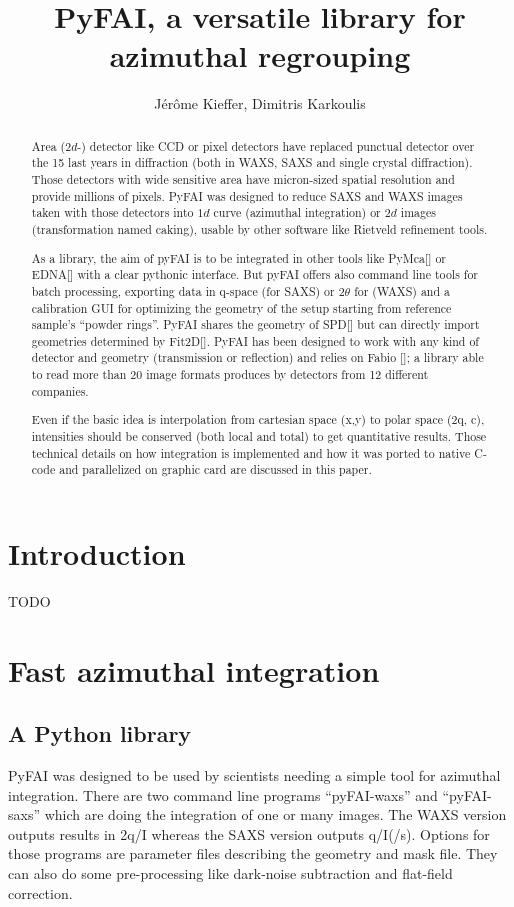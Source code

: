 \documentclass[a4paper]{jpconf}
\begin{document}
\title{PyFAI, a versatile library for azimuthal regrouping}

\author{J\'er\^ome Kieffer, Dimitris Karkoulis}

\address{European Synchrotron Radiation Facility; 6 rue Jules Horowitz;
38043 Grenoble; France}


\begin{abstract}
Area ($2d$-) detector like CCD or pixel detectors have replaced punctual detector
over the 15 last years in diffraction (both in WAXS, SAXS and single crystal
diffraction). Those detectors with wide sensitive area have micron-sized spatial 
resolution and provide millions of pixels. PyFAI was designed to reduce SAXS and
WAXS images taken with those detectors into $1d$ curve (azimuthal integration)
or $2d$ images (transformation named caking), usable by other software like Rietveld 
refinement tools.

As a library, the aim of pyFAI is to be integrated in other tools like PyMca[]
or EDNA[] with a clear pythonic interface. But pyFAI offers also command line
tools for batch processing, exporting data in q-space (for SAXS) or 2$\theta$ for
(WAXS)  and a calibration GUI for optimizing the geometry of the setup starting
from  reference sample's “powder rings”.  PyFAI shares the geometry of SPD[] but
can directly import geometries determined by Fit2D[].  PyFAI has been designed
to  work with any kind of detector and geometry (transmission or reflection) and
relies on Fabio []; a library able to read more than 20 image formats produces
by  detectors from 12 different companies.

Even if the basic idea is interpolation from cartesian space (x,y) to polar 
space (2q, c), intensities should be conserved (both local and total) to get
quantitative results.  Those technical details on how integration is implemented
and how it was ported to native C-code and parallelized on graphic card are
discussed  in this paper.
\end{abstract}

\section{Introduction}
TODO

\section{Fast azimuthal integration}
\subsection{A Python library}
	PyFAI was designed to be used by scientists needing a simple tool for azimuthal
	integration. There are two command line programs “pyFAI-waxs” and “pyFAI-saxs” 
	which are doing the integration of one or many images. The WAXS version outputs
	results in 2q/I  whereas the SAXS version outputs q/I(/s). Options for those
	programs are parameter  files describing the geometry and mask file. They can
	also do some  pre-processing like dark-noise subtraction and flat-field correction.
	
\end{document}
